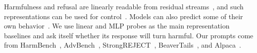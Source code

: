 Harmfulness and refusal are linearly readable from residual streams~\citep{zou2023representation,arditi2024refusal}, and such representations can be used for control~\citep{zou2024circuit}. Models can also predict some of their own behavior~\citep{binder2024looking}. We use linear and MLP probes as the main representation baselines and ask \qwen itself whether its response will turn harmful. Our prompts come from HarmBench~\citep{mazeika2024harmbench}, AdvBench~\citep{zou2023universal}, StrongREJECT~\citep{souly2024strongreject}, BeaverTails~\citep{ji2023beavertails}, and Alpaca~\citep{taori2023alpaca}.
